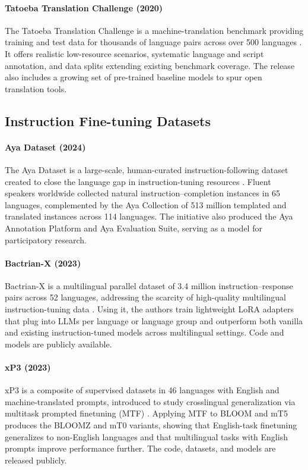 \documentclass[letterpaper]{article}
\begin{document}
\paragraph{Tatoeba Translation Challenge (2020)} The Tatoeba Translation Challenge is a machine-translation benchmark providing training and test data for thousands of language pairs across over 500 languages \citep{tiedemann-2020-tatoeba}. It offers realistic low-resource scenarios, systematic language and script annotation, and data splits extending existing benchmark coverage. The release also includes a growing set of pre-trained baseline models to spur open translation tools.

\subsection{Instruction Fine-tuning Datasets}

\paragraph{Aya Dataset (2024)} The Aya Dataset is a large-scale, human-curated instruction-following dataset created to close the language gap in instruction-tuning resources \citep{singh2024aya}. Fluent speakers worldwide collected natural instruction--completion instances in 65 languages, complemented by the Aya Collection of 513 million templated and translated instances across 114 languages. The initiative also produced the Aya Annotation Platform and Aya Evaluation Suite, serving as a model for participatory research.

\paragraph{Bactrian-X (2023)} Bactrian-X is a multilingual parallel dataset of 3.4 million instruction--response pairs across 52 languages, addressing the scarcity of high-quality multilingual instruction-tuning data \citep{li2023bactrianxmultilingualreplicableinstructionfollowing}. Using it, the authors train lightweight LoRA adapters that plug into LLMs per language or language group and outperform both vanilla and existing instruction-tuned models across multilingual settings. Code and models are publicly available.

\paragraph{xP3 (2023)} xP3 is a composite of supervised datasets in 46 languages with English and machine-translated prompts, introduced to study crosslingual generalization via multitask prompted finetuning (MTF) \citep{muennighoff2023crosslingualgeneralizationmultitaskfinetuning}. Applying MTF to BLOOM and mT5 produces the BLOOMZ and mT0 variants, showing that English-task finetuning generalizes to non-English languages and that multilingual tasks with English prompts improve performance further. The code, datasets, and models are released publicly.
\end{document}
